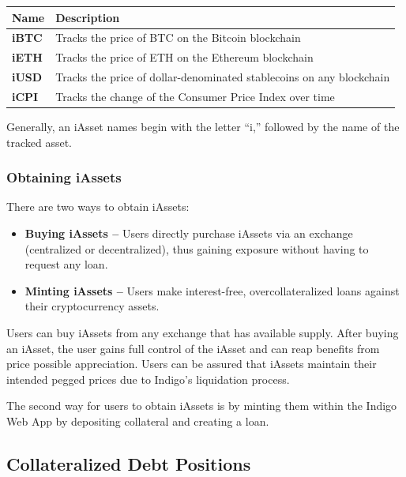 \documentclass{article}
\begin{document}
\begin{sloppypar}
\begin{tabularx}{\linewidth}{l|l}
\caption{Examples of possible iAssets}
\tabularnewline
\toprule
\textbf{Name} & \textbf{Description}
\tabularnewline
\midrule
\endhead
\textbf{iBTC} & Tracks the price of BTC on the Bitcoin
blockchain
\tabularnewline
\midrule
\textbf{iETH} & Tracks the price of ETH on the Ethereum
blockchain
\tabularnewline
\midrule
\textbf{iUSD} & Tracks the price of dollar-denominated stablecoins on
any blockchain
\tabularnewline
\midrule
\textbf{iCPI} & Tracks the change of the Consumer Price Index over
time
\tabularnewline
\bottomrule
\end{tabularx}


Generally, an iAsset names begin with the letter ``i,'' followed by the
name of the tracked asset.

\hypertarget{obtaining-iassets}{%
\subsubsection{Obtaining iAssets}\label{obtaining-iassets}}

There are two ways to obtain iAssets:

\begin{itemize}
\item
  \textbf{Buying iAssets --} Users directly purchase iAssets via an
  exchange (centralized or decentralized), thus gaining exposure without
  having to request any loan.
\item
  \textbf{Minting iAssets --} Users make interest-free,
  overcollateralized loans against their cryptocurrency assets.
\end{itemize}

Users can buy iAssets from any exchange that has available supply. After
buying an iAsset, the user gains full control of the iAsset and can reap
benefits from price possible appreciation. Users can be assured that
iAssets maintain their intended pegged prices due to Indigo's
liquidation process.

The second way for users to obtain iAssets is by minting them within the
Indigo Web App by depositing collateral and creating a loan.

\hypertarget{collateralized-debt-positions}{%
\subsection{Collateralized Debt
Positions}\label{collateralized-debt-positions}}


\end{sloppypar}
\end{document}
